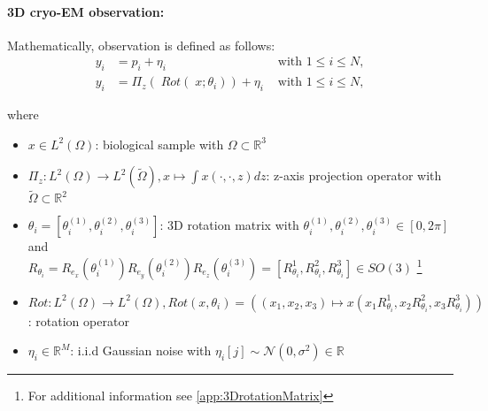 \paragraph{3D cryo-EM observation:}
Mathematically, observation is defined as follows:
\begin{equation}
    \label{eq:cryoEmSimple}
    \begin{aligned}
        y_i &= p_i + \eta_i &\text{ with } 1 \leq i \leq N,\\
        y_i &= \Pi_z  (\; Rot (\;x; \theta_i )) + \eta_i &\text{ with } 1 \leq i \leq N,    
    \end{aligned}
\end{equation}

where 
\begin{itemize}
    \item $x \in L^2(\Omega)$: biological sample with $\Omega \subset \mathbb{R}^3 $
    \item $\Pi_z : L^2(\Omega) \to L^2(\tilde{\Omega}), x \mapsto  \int x(\cdot,\cdot,z) dz$: z-axis projection operator
          with $\tilde{\Omega} \subset \mathbb{R}^2$
    \item $\theta_i = [\theta_i^{(1)}, \theta_i^{(2)}, \theta_i^{(3)} ] $: 3D rotation matrix with $ \theta_i^{(1)}, \theta_i^{(2)}, \theta_i^{(3)} \in [0, 2 \pi]$ and \\
          $R_{\theta_i} =  R_{e_x} (\theta_i^{(1)}) R_{e_y} (\theta_i^{(2)}) R_{e_z} (\theta_i^{(3)}) = [R^1_{\theta_i}, R^2_{\theta_i}, R^3_{\theta_i}] \in SO(3)$ 
          \footnote{For additional information see \ref{app:3DrotationMatrix}}
          
    \item $\textit{Rot} : L^2(\Omega) \to L^2(\Omega), \textit{Rot}(x, \theta_i) = \left((x_1,x_2,x_3) \mapsto x( x_1R^1_{\theta_i}, x_2R^2_{\theta_i}, x_3R^3_{\theta_i})\right)$: rotation operator
    \item $\eta_i \in \mathbb{R}^M$: i.i.d Gaussian noise with $\eta_i[j] \sim \mathcal{N}(0,\sigma^2) \in \mathbb{R}$
\end{itemize}



